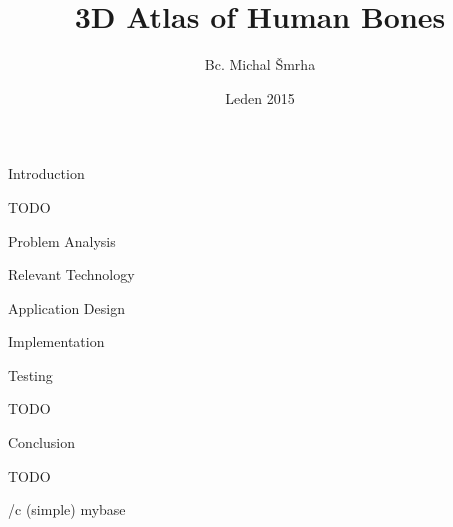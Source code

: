 

\worktype [M/EN]
\title {3D Atlas of Human Bones}
\author {Bc. Michal Šmrha}
\date {Leden 2015}
\makefront

\chap Introduction

TODO

\chap Problem Analysis



\chap Relevant Technology



\chap Application Design



\chap Implementation



\chap Testing

TODO

\chap Conclusion

TODO

\bibchap
\usebib/c (simple) mybase

\bye